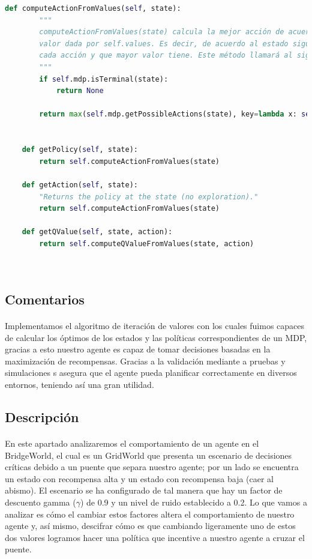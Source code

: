 \documentclass{report}
\begin{document}
\begin{lstlisting}[language=Python, caption=Iteración de valores]
    def computeActionFromValues(self, state):
        """
        computeActionFromValues(state) calcula la mejor acción de acuerdo con la función de
        valor dada por self.values. Es decir, de acuerdo al estado siguiente al que nos lleva
        cada acción y que mayor valor tiene. Este método llamará al siguiente.
        """
        if self.mdp.isTerminal(state):
            return None

        return max(self.mdp.getPossibleActions(state), key=lambda x: self.computeQValueFromValues(state, x))
        

    def getPolicy(self, state):
        return self.computeActionFromValues(state)

    def getAction(self, state):
        "Returns the policy at the state (no exploration)."
        return self.computeActionFromValues(state)

    def getQValue(self, state, action):
        return self.computeQValueFromValues(state, action)

    
\end{lstlisting}
      \subsection*{Comentarios}
        \paragraph*{}{
          Implementamos el algoritmo de iteración de valores con los cuales fuimos capaces de calcular los óptimos de los estados y las políticas correspondientes de un MDP, gracias a esto nuestro agente es capaz de tomar decisiones basadas en la maximización de recompensas. Gracias a la validación mediante a pruebas y simulaciones s asegura que el agente pueda planificar correctamente en diversos entornos, teniendo así una gran utilidad.
        }
      \subsection*{Descripción}
        \paragraph*{}{
          En este apartado analizaremos el comportamiento de un agente en el BridgeWorld, el cual es un GridWorld que presenta un escenario de decisiones críticas debido a un puente que separa nuestro agente; por un lado se encuentra un estado con recompensa alta y un estado con recompensa baja (caer al abismo).
          El escenario se ha configurado de tal manera que hay un factor de descuento gamma (\(\gamma\)) de 0.9 y un nivel de ruido establecido a 0.2.
          Lo que vamos a analizar es cómo el cambiar estos factores altera el comportamiento de nuestro agente y, así mismo, descifrar cómo es que cambiando ligeramente uno de estos dos valores logramos hacer una política que incentive a nuestro agente a cruzar el puente.
        }
\end{document}

